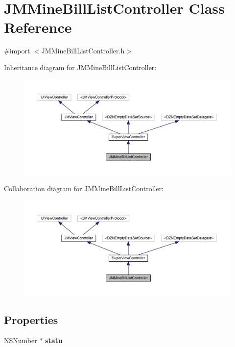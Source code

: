 \hypertarget{interface_j_m_mine_bill_list_controller}{}\section{J\+M\+Mine\+Bill\+List\+Controller Class Reference}
\label{interface_j_m_mine_bill_list_controller}


{\ttfamily \#import $<$J\+M\+Mine\+Bill\+List\+Controller.\+h$>$}



Inheritance diagram for J\+M\+Mine\+Bill\+List\+Controller\+:\nopagebreak
\begin{figure}[H]
\begin{center}
\leavevmode
\includegraphics[width=350pt]{interface_j_m_mine_bill_list_controller__inherit__graph}
\end{center}
\end{figure}


Collaboration diagram for J\+M\+Mine\+Bill\+List\+Controller\+:\nopagebreak
\begin{figure}[H]
\begin{center}
\leavevmode
\includegraphics[width=350pt]{interface_j_m_mine_bill_list_controller__coll__graph}
\end{center}
\end{figure}
\subsection*{Properties}
\begin{DoxyCompactItemize}
\item 
\mbox{\label{interface_j_m_mine_bill_list_controller_a162f38281e9f73721acf49a1234f46aa}} 
N\+S\+Number $\ast$ {\bfseries statu}
\end{DoxyCompactItemize}
